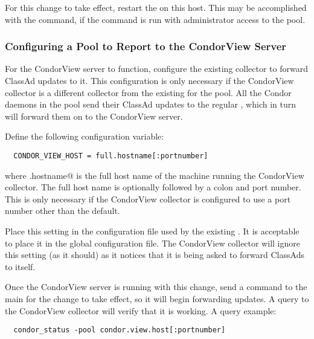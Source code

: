 For this change to take effect, restart the
 on this host.
This may be accomplished with the  command,
if the command is run with
administrator access to the pool.


\subsubsection{\label{sec:CondorView-Pool-Setup}
Configuring a Pool to Report to the CondorView Server} 

For the CondorView server to function, configure the existing collector to
forward ClassAd updates to it.
This configuration is only necessary if 
the CondorView collector is a different collector from the existing
 for the pool.
All the Condor daemons in the pool send their ClassAd updates to the
regular , which in turn will forward them on to the
CondorView server.

Define the following configuration variable:
\footnotesize
\begin{verbatim}
  CONDOR_VIEW_HOST = full.hostname[:portnumber]
\end{verbatim}
\normalsize
where \verb@full.hostname@ is the full host name of the machine 
running the CondorView collector.
The full host name is optionally followed by a colon and
port number.  This is only necessary if the CondorView
collector is configured to use a port number other than the default.

Place this setting in the configuration file used by the existing 
.
It is acceptable to place it in the global configuration file.  The
CondorView collector will ignore this setting (as it should) as it notices
that it is being asked to forward ClassAds to itself.

Once the CondorView server is running with this 
change, send a
 command to the main  for the change to
take effect, so it will begin forwarding updates.  
A query to the CondorView collector will verify that it is working.
A query example:

\footnotesize
\begin{verbatim}
  condor_status -pool condor.view.host[:portnumber]
\end{verbatim}
\normalsize
